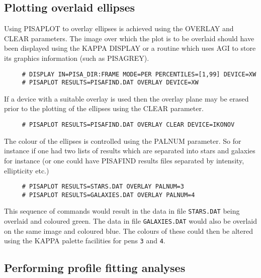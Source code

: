 \subsection{Plotting overlaid ellipses}
Using PISAPLOT to overlay ellipses is achieved using the OVERLAY and
CLEAR parameters. The image over which the plot is to be overlaid should
have been displayed using the KAPPA DISPLAY or a routine which uses AGI
to store its graphics information (such as PISAGREY).
\begin{verbatim}
     # DISPLAY IN=PISA_DIR:FRAME MODE=PER PERCENTILES=[1,99] DEVICE=XW
     # PISAPLOT RESULTS=PISAFIND.DAT OVERLAY DEVICE=XW
\end{verbatim}

If a device with a suitable overlay is used then the overlay plane may
be erased prior to the plotting of the ellipses using the CLEAR
parameter.
\begin{verbatim}
     # PISAPLOT RESULTS=PISAFIND.DAT OVERLAY CLEAR DEVICE=IKONOV
\end{verbatim}

The colour of the ellipses is controlled using the PALNUM parameter. So
for instance if one had two lists of results which are separated into
stars and galaxies for instance (or one could have PISAFIND results
files separated by intensity, ellipticity etc.)
\begin{verbatim}
     # PISAPLOT RESULTS=STARS.DAT OVERLAY PALNUM=3
     # PISAPLOT RESULTS=GALAXIES.DAT OVERLAY PALNUM=4
\end{verbatim}
This sequence of commands would result in the data in file
\verb+STARS.DAT+ being overlaid and coloured green. The data in file
\verb+GALAXIES.DAT+ would also be overlaid on the same image and
coloured blue. The colours of these could then be altered using the
KAPPA palette facilities for pens \verb+3+ and \verb+4+.

\subsection{Performing profile fitting analyses}

